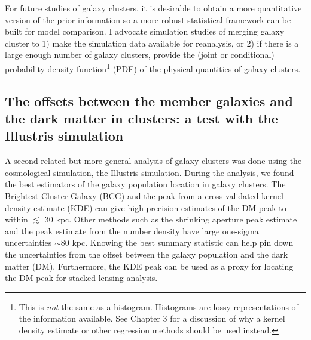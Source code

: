 For future studies of galaxy clusters, 
it is desirable to obtain a more quantitative version of the 
prior information so a more robust statistical framework can be built for model
comparison. 
I advocate simulation studies of merging galaxy cluster  
to 1) make the simulation data available for reanalysis, or 2) if there is a large
enough number of galaxy clusters, provide the
(joint or conditional) probability density function\footnote{This is {\it not}
the same as a histogram. Histograms are lossy representations of the information 
available. See Chapter 3 for a discussion of why a kernel density estimate or
other regression methods should be used instead.} (PDF) of the physical quantities
of galaxy clusters. 

\subsection{The offsets between the member galaxies and the dark
matter in clusters: a test with the Illustris simulation}
A second related but more general analysis of galaxy clusters was done using the
cosmological simulation, the Illustris simulation. 
During the analysis, we found the best 
estimators of the galaxy population location in galaxy clusters. 
The Brightest Cluster
Galaxy (BCG) and the peak from a cross-validated kernel density estimate (KDE)
can give high precision estimates of the DM peak to within $\lesssim$ 30 kpc.
Other methods such as the shrinking aperture peak estimate and the peak estimate 
from the number density have large one-sigma uncertainties $\sim 80$ kpc.   
Knowing the best summary statistic can help pin down the uncertainties from  
the offset between the galaxy population and the dark matter (DM). Furthermore,
the KDE peak can be used as a proxy for locating the DM peak for stacked
lensing analysis.  


